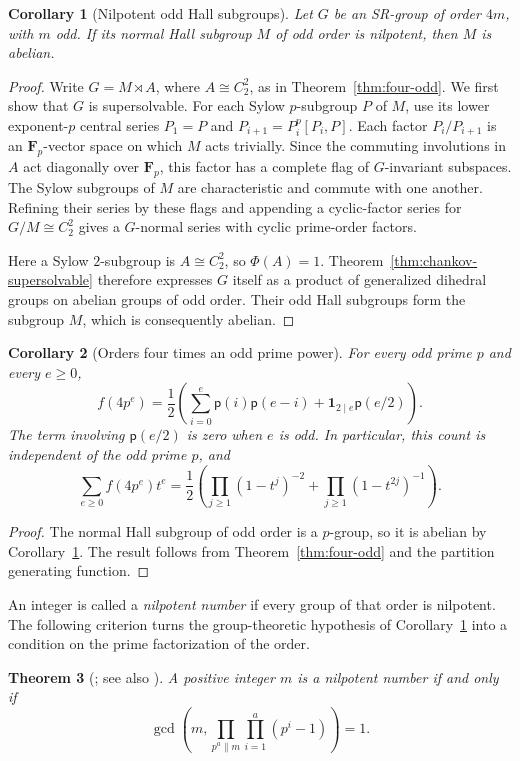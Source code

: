 \documentclass[11pt,a4paper]{amsart}
\newtheorem{thm}{Theorem}[section]
\newtheorem{corl}[thm]{Corollary}
\theoremstyle{definition}
\theoremstyle{remark}
\numberwithin{equation}{section}
\begin{document}
\begin{corl}[Nilpotent odd Hall subgroups]\label{thm:nilpotent-odd-hall}
Let $G$ be an SR-group of order $4m$, with $m$ odd. If its normal Hall
subgroup $M$ of odd order is nilpotent, then $M$ is abelian.
\end{corl}
\begin{proof}
Write $G=M\rtimes A$, where $A\cong C_2^2$, as in
Theorem~\ref{thm:four-odd}. We first show that $G$ is supersolvable.
For each Sylow $p$-subgroup $P$ of $M$, use its lower exponent-$p$
central series $P_1=P$ and $P_{i+1}=P_i^p[P_i,P]$.
Each factor $P_i/P_{i+1}$ is an $\mathbf F_p$-vector space on which
$M$ acts trivially. Since the commuting involutions in $A$ act
diagonally over $\mathbf F_p$, this factor has a complete flag of
$G$-invariant subspaces. The Sylow subgroups of $M$ are characteristic
and commute with one another. Refining their series by these flags
and appending a cyclic-factor series for $G/M\cong C_2^2$ gives a
$G$-normal series with cyclic prime-order factors.

Here a Sylow $2$-subgroup is $A\cong C_2^2$, so $\Phi(A)=1$.
Theorem~\ref{thm:chankov-supersolvable} therefore expresses $G$
itself as a product of generalized dihedral groups on abelian groups
of odd order. Their odd Hall subgroups form the subgroup $M$, which
is consequently abelian.
\end{proof}

\begin{corl}[Orders four times an odd prime power]
\label{cor:four-prime-power}
For every odd prime $p$ and every $e\ge0$,
\[
 \boxed{f(4p^e)=\frac12\left(
 \sum_{i=0}^e\mathsf p(i)\mathsf p(e-i)
 +\mathbf1_{2\mid e}\mathsf p(e/2)\right).}
\]
The term involving $\mathsf p(e/2)$ is zero when $e$ is odd.
In particular, this count is independent of the odd prime $p$, and
\[
 \sum_{e\ge0}f(4p^e)t^e
 =\frac12\left(\prod_{j\ge1}(1-t^j)^{-2}
              +\prod_{j\ge1}(1-t^{2j})^{-1}\right).
\]
\end{corl}
\begin{proof}
The normal Hall subgroup of odd order is a $p$-group, so it is
abelian by Corollary~\ref{thm:nilpotent-odd-hall}. The result follows
from Theorem~\ref{thm:four-odd} and the partition generating function.
\end{proof}

An integer is called a \emph{nilpotent number} if every group of that
order is nilpotent. The following criterion turns the group-theoretic
hypothesis of Corollary~\ref{thm:nilpotent-odd-hall} into a condition on
the prime factorization of the order.
\begin{thm}[{\cite[Theorem~1]{PS00}; see also \cite[Introduction]{Just23}}]
\label{thm:nilpotent-number-criterion}
A positive integer $m$ is a nilpotent number if and only if
\[
 \gcd\!\left(m,\prod_{p^a\parallel m}\prod_{i=1}^{a}(p^i-1)\right)=1.
\]
\end{thm}
\end{document}
